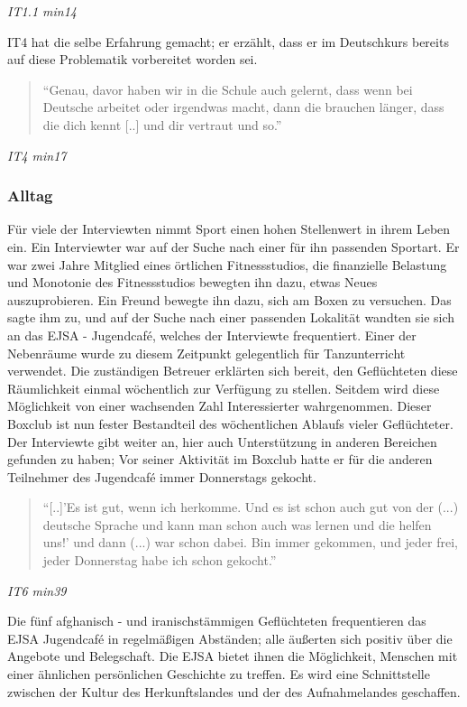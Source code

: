 \centerline{\textit{IT1.1 min14}}
IT4 hat die selbe Erfahrung gemacht; er erzählt, dass er im Deutschkurs bereits auf diese Problematik vorbereitet worden sei.
\begin{quote}
    ``Genau, davor haben wir in die Schule auch gelernt, dass wenn bei Deutsche arbeitet oder irgendwas macht, dann die brauchen länger, dass die dich kennt [..] und dir vertraut und so.''
\end{quote}
\centerline{\textit{IT4 min17}}

\subsubsection{Alltag}
Für viele der Interviewten nimmt Sport einen hohen Stellenwert in ihrem Leben ein. Ein Interviewter war auf der Suche nach einer für ihn passenden Sportart. Er war zwei Jahre Mitglied eines örtlichen Fitnessstudios, die finanzielle Belastung und Monotonie des Fitnessstudios bewegten ihn dazu, etwas Neues auszuprobieren.\newline
Ein Freund bewegte ihn dazu, sich am Boxen zu versuchen. Das sagte ihm zu, und auf der Suche nach einer passenden Lokalität wandten sie sich an das EJSA - Jugendcafé, welches der Interviewte frequentiert. Einer der Nebenräume wurde zu diesem Zeitpunkt gelegentlich für Tanzunterricht verwendet. Die zuständigen Betreuer erklärten sich bereit, den Geflüchteten diese Räumlichkeit einmal wöchentlich zur Verfügung zu stellen. Seitdem wird diese Möglichkeit von einer wachsenden Zahl Interessierter wahrgenommen.\newline
Dieser Boxclub ist nun fester Bestandteil des wöchentlichen Ablaufs vieler Geflüchteter. Der Interviewte gibt weiter an, hier auch Unterstützung in anderen Bereichen gefunden zu haben; Vor seiner Aktivität im Boxclub hatte er für die anderen Teilnehmer des Jugendcafé immer Donnerstags gekocht.
\begin{quote}
    ``[..]'Es ist gut, wenn ich herkomme. Und es ist schon auch gut von der (...) deutsche Sprache und kann man schon auch was lernen und die helfen uns!' und dann (...) war schon dabei. Bin immer gekommen, und jeder frei, jeder Donnerstag habe ich schon gekocht.''
\end{quote}
\centerline{\textit{IT6 min39}}
Die fünf afghanisch - und iranischstämmigen Geflüchteten frequentieren das EJSA Jugendcafé in regelmäßigen Abständen; alle äußerten sich positiv über die Angebote und Belegschaft. Die EJSA bietet ihnen die Möglichkeit, Menschen mit einer ähnlichen persönlichen Geschichte zu treffen. Es wird eine Schnittstelle zwischen der Kultur des Herkunftslandes und der des Aufnahmelandes geschaffen.

